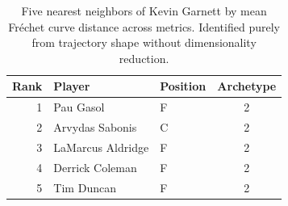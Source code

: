 \begin{table}[htbp]
  \centering\small
  \begin{tabular}{rllc}
    \toprule
    Rank & Player & Position & Archetype \\
    \midrule
    1 & Pau Gasol & F & 2 \\
    2 & Arvydas Sabonis & C & 2 \\
    3 & LaMarcus Aldridge & F & 2 \\
    4 & Derrick Coleman & F & 2 \\
    5 & Tim Duncan & F & 2 \\
    \bottomrule
  \end{tabular}
  \caption{Five nearest neighbors of Kevin Garnett by mean Fr\'{e}chet curve distance across metrics. Identified purely from trajectory shape without dimensionality reduction.}
  \label{tab:Kevin_Garnett_frechet_curve_neighbors}
\end{table}

